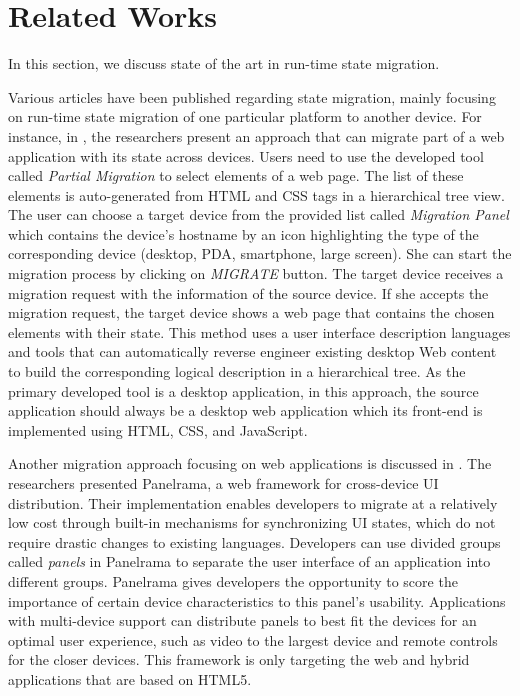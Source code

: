 \chapter{Related Works}
In this section, we discuss state of the art in run-time state migration.
\label{ch:related}

Various articles have been published regarding state migration, mainly focusing on run-time state migration of one particular platform to another device. For instance, in \cite{r1-10.1145/1851600.1851653}, the researchers present an approach that can migrate part of a web application with its state across devices. Users need to use the developed tool called \textit{Partial Migration} to select elements of a web page. The list of these elements is auto-generated from HTML and CSS tags in a hierarchical tree view. The user can choose a target device from the provided list called \textit{Migration Panel} which contains the device’s hostname by an icon highlighting the type of the corresponding device (desktop, PDA, smartphone, large screen). She can start the migration process by clicking on \textit{MIGRATE} button. The target device receives a migration request with the information of the source device. If she accepts the migration request, the target device shows a web page that contains the chosen elements with their state. This method uses a user interface description languages \cite{r5-maria-10.1145/1614390.1614394} and tools that can automatically reverse engineer existing desktop Web content to build the corresponding logical description in a hierarchical tree. As the primary developed tool is a desktop application, in this approach, the source application should always be a desktop web application which its front-end is implemented using HTML, CSS, and JavaScript.

Another migration approach focusing on web applications is discussed in \cite{r2-zaplata}. The researchers presented Panelrama, a web framework for cross-device UI distribution. Their implementation enables developers to migrate at a relatively low cost through built-in mechanisms for synchronizing UI states, which do not require drastic changes to existing languages. Developers can use divided groups called \textit{panels} in Panelrama to separate the user interface of an application into different groups. Panelrama gives developers the opportunity to score the importance of certain device characteristics to this panel’s usability. Applications with multi-device support can distribute panels to best fit the devices for an optimal user experience, such as video to the largest device and remote controls for the closer devices. This framework is only targeting the web and hybrid applications that are based on HTML5.

